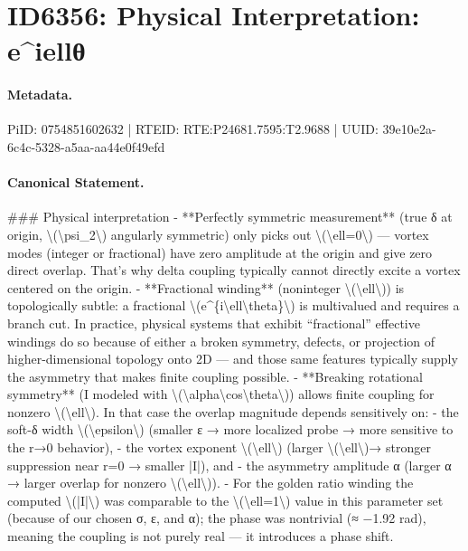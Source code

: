 \section*{ID6356: Physical Interpretation: e\textasciicircum{}iellθ}
\paragraph{Metadata.}
PiID: 0754851602632 | RTEID: RTE:P24681.7595:T2.9688 | UUID: 39e10e2a-6c4c-5328-a5aa-aa44e0f49efd

\paragraph{Canonical Statement.}
\#\#\# Physical interpretation - **Perfectly symmetric measurement** (true δ at origin, \textbackslash{}(\textbackslash{}psi\_2\textbackslash{}) angularly symmetric) only picks out \textbackslash{}(\textbackslash{}ell=0\textbackslash{}) — vortex modes (integer or fractional) have zero amplitude at the origin and give zero direct overlap. That’s why delta coupling typically cannot directly excite a vortex centered on the origin. - **Fractional winding** (noninteger \textbackslash{}(\textbackslash{}ell\textbackslash{})) is topologically subtle: a fractional \textbackslash{}(e\textasciicircum{}\{i\textbackslash{}ell\textbackslash{}theta\}\textbackslash{}) is multivalued and requires a branch cut. In practice, physical systems that exhibit “fractional” effective windings do so because of either a broken symmetry, defects, or projection of higher-dimensional topology onto 2D — and those same features typically supply the asymmetry that makes finite coupling possible. - **Breaking rotational symmetry** (I modeled with \textbackslash{}(\textbackslash{}alpha\textbackslash{}cos\textbackslash{}theta\textbackslash{})) allows finite coupling for nonzero \textbackslash{}(\textbackslash{}ell\textbackslash{}). In that case the overlap magnitude depends sensitively on: - the soft-δ width \textbackslash{}(\textbackslash{}epsilon\textbackslash{}) (smaller ε → more localized probe → more sensitive to the r→0 behavior), - the vortex exponent \textbackslash{}(\textbackslash{}ell\textbackslash{}) (larger \textbackslash{}(\textbackslash{}ell\textbackslash{})→ stronger suppression near r=0 → smaller |I|), and - the asymmetry amplitude α (larger α → larger overlap for nonzero \textbackslash{}(\textbackslash{}ell\textbackslash{})). - For the golden ratio winding the computed \textbackslash{}(|I|\textbackslash{}) was comparable to the \textbackslash{}(\textbackslash{}ell=1\textbackslash{}) value in this parameter set (because of our chosen σ, ε, and α); the phase was nontrivial (≈ −1.92 rad), meaning the coupling is not purely real — it introduces a phase shift.

